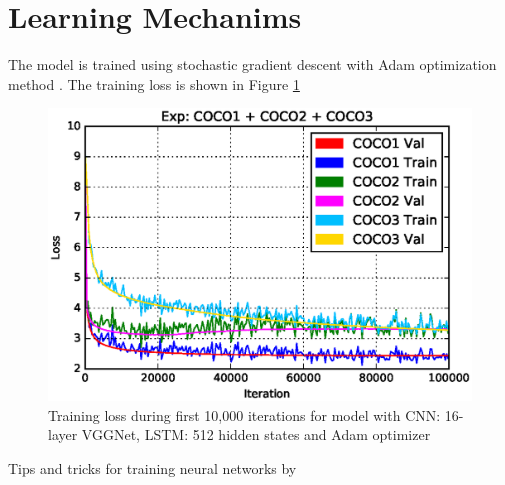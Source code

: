 \section{Learning Mechanims}
The model is trained using stochastic gradient descent with Adam optimization method \cite{DBLP:journals/corr/KingmaB14}. The training loss is shown in Figure \ref{fig:vgg_adam}

\begin{figure}
  \label{fig:vgg_adam}
  \centering
  \includegraphics[width=0.8\linewidth]{Chapters/Fig/coco1_coco2_coco3_loss.eps}
  \caption{Training loss during first 10,000 iterations for model with CNN: 16-layer VGGNet, LSTM: 512 hidden states and Adam optimizer}
\end{figure}

\nocite{MLOxford}

Tips and tricks for training neural networks by \cite{DBLP:journals/corr/abs-1206-5533}